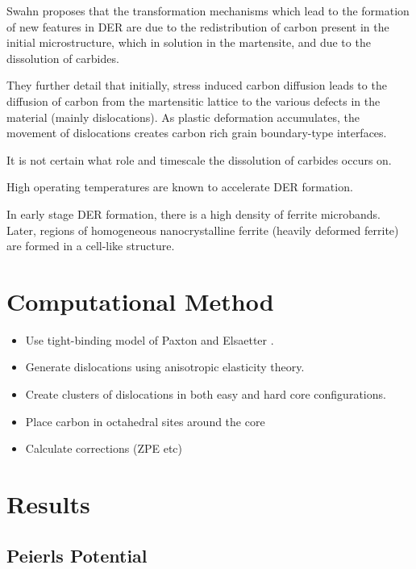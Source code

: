 \documentclass[a4paper]{article}
\begin{document}
Swahn proposes that the transformation mechanisms which lead to the
formation of new features in DER are due to the redistribution of
carbon present in the initial microstructure, which in solution in
the martensite, and due to the dissolution of carbides. 

They further detail that initially, stress induced carbon diffusion
leads to the diffusion of carbon from the martensitic lattice to
the various defects in the material (mainly dislocations). 
As plastic deformation accumulates, the movement of dislocations
creates carbon rich grain boundary-type interfaces. 

It is not certain what role and timescale the dissolution of
carbides occurs on. 

High operating temperatures are known to accelerate DER formation. 

In early stage DER formation, there is a high density of ferrite
microbands. Later, regions of homogeneous nanocrystalline ferrite
(heavily deformed ferrite) are formed in a cell-like structure.







\section{Computational Method}
\label{sec:org0aeeb98}

\begin{itemize}
\item Use tight-binding model of Paxton and Elsaetter \cite{Paxton2013}.
\item Generate dislocations using anisotropic elasticity theory.
\item Create clusters of dislocations in both easy and hard core
configurations.
\item Place carbon in octahedral sites around the core
\item Calculate corrections (ZPE etc)
\end{itemize}


\section{Results}
\label{sec:orgd1bf118}



\subsection{Peierls Potential}
\label{sec:org7abb9ff}
\end{document}
